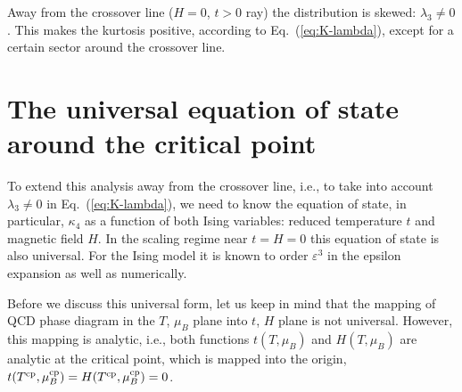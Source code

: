 \documentclass[prl,twocolumn,nofootinbib]{revtex4}
\begin{document}
Away from the crossover line ($H=0$, $t>0$ ray) the distribution is skewed:
$\lambda_3\neq0$. This makes the kurtosis positive, according to
Eq.~(\ref{eq:K-lambda}), except for a
certain sector around the crossover line.



\section{The universal equation of state around the critical point}

\label{sec:univ-equat-state}



To extend this analysis away from the crossover line, i.e., to take into account
$\lambda_3\neq0$ in Eq.~(\ref{eq:K-lambda}), we need to know the equation of state, in
particular, $\kappa_4$ as a function of both Ising variables: reduced
temperature $t$ and magnetic field $H$. In the scaling regime near
$t=H=0$ this equation of state is also universal. For the Ising model
it is known to order $\varepsilon^3$ in the epsilon expansion as well
as numerically.

Before we discuss this universal form, let us keep in mind that the
mapping of QCD phase diagram in the $T$, $\mu_B$ plane into
$t$, $H$ plane is not universal. However, this mapping
is analytic, i.e., both functions $t(T,\mu_B)$ and $H(T,\mu_B)$ are
analytic at the critical point, which is mapped into the origin,
$t(T^{\rm cp},\mu_B^{\rm cp})=H(T^{\rm cp},\mu_B^{\rm cp})=0$.
\end{document}
